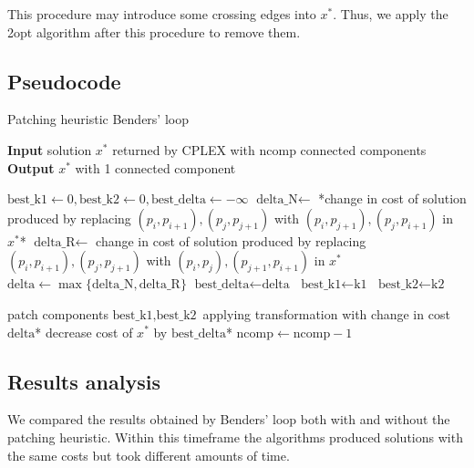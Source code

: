 This procedure may introduce some crossing edges into $x^*$. Thus, we apply the 2opt algorithm after this procedure to remove them.

\newpage
\subsection{Pseudocode}
\begin{algorithm}[h]
    \caption{Patching heuristic Benders' loop}
    \textbf{Input} solution $x^*$ returned by CPLEX with ncomp connected components\\
    \textbf{Output} $x^*$ with 1 connected component\\
    \begin{algorithmic}

        \State $\text{best\_k1}\gets0, \text{best\_k2}\gets0, \text{best\_delta}\gets-\infty$
        \State $\text{delta\_N}\gets$ *change in cost of solution produced by replacing
        \State $(p_i,p_{i+1}), (p_j,p_{j+1})$ with $(p_i,p_{j+1}), (p_j,p_{i+1})$ in $x^*$*
        \State $\text{delta\_R}\gets$ change in cost of solution produced by replacing
        \State $(p_i,p_{i+1}), (p_j,p_{j+1})$ with $(p_i,p_j), (p_{j+1},p_{i+1})$ in $x^*$
        \State $\text{delta}\gets\max\{\text{delta\_N},\text{delta\_R}\}$
        \State $\text{best\_delta} \gets \text{delta}$
        \State $\text{best\_k1}\gets \text{k1}$
        \State $\text{best\_k2}\gets \text{k2}$
        \EndIf
        \EndFor
        \EndFor

        \State *patch components $\text{best\_k1},\text{best\_k2}$ applying transformation with change in cost
        \State $\text{delta}$*
        \State *decrease cost of $x^*$ by $\text{best\_delta}$*
        \State $\text{ncomp} \gets \text{ncomp}-1$
        \EndWhile
    \end{algorithmic}
    
\end{algorithm}

\subsection{Results analysis}

We compared the results obtained by Benders' loop both with and without the patching heuristic. Within this timeframe the algorithms produced solutions with the same costs but took different amounts of time.

